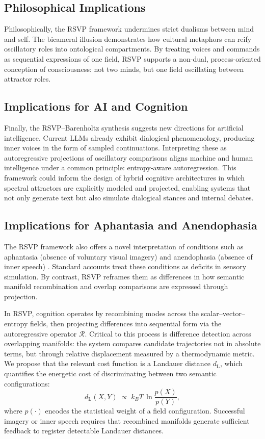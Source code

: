 \documentclass[a4paper,11pt]{article}
\begin{document}
\subsection{Philosophical Implications}
Philosophically, the RSVP framework undermines strict dualisms between mind and
self. The bicameral illusion demonstrates how cultural metaphors can reify
oscillatory roles into ontological compartments. By treating voices and
commands as sequential expressions of one field, RSVP supports a non-dual,
process-oriented conception of consciousness: not two minds, but one field
oscillating between attractor roles.

\subsection{Implications for AI and Cognition}
Finally, the RSVP--Barenholtz synthesis suggests new directions for artificial
intelligence. Current LLMs already exhibit dialogical phenomenology, producing
inner voices in the form of sampled continuations. Interpreting these as
autoregressive projections of oscillatory comparisons aligns machine and human
intelligence under a common principle: entropy-aware autoregression. This
framework could inform the design of hybrid cognitive architectures in which
spectral attractors are explicitly modeled and projected, enabling systems that
not only generate text but also simulate dialogical stances and internal
debates.

\subsection{Implications for Aphantasia and Anendophasia}

The RSVP framework also offers a novel interpretation of conditions such as
aphantasia (absence of voluntary visual imagery) \citep{Dawes2024} and anendophasia (absence of
inner speech) \citep{Nedergaard2024}. Standard accounts treat these conditions as deficits in sensory
simulation. By contrast, RSVP reframes them as differences in how semantic
manifold recombination and overlap comparisons are expressed through
projection.

In RSVP, cognition operates by recombining modes across the scalar--vector--
entropy fields, then projecting differences into sequential form via the
autoregressive operator $\mathcal{R}$. Critical to this process is
difference detection across overlapping manifolds: the system compares
candidate trajectories not in absolute terms, but through relative displacement
measured by a thermodynamic metric. We propose that the relevant cost function
is a Landauer distance $d_{\mathrm{L}}$, which quantifies the energetic
cost of discriminating between two semantic configurations:
\begin{equation}
d_{\mathrm{L}}(X,Y) \;\propto\; k_B T \,\ln \frac{p(X)}{p(Y)},
\end{equation}
where $p(\cdot)$ encodes the statistical weight of a field configuration.
Successful imagery or inner speech requires that recombined manifolds generate
sufficient feedback to register detectable Landauer distances.
\end{document}
